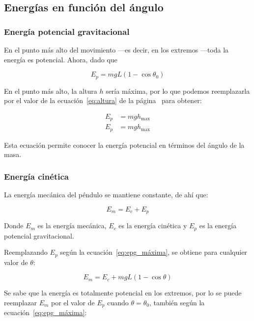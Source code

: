 \documentclass[letterpaper]{report}
\numberwithin{table}{section}
\begin{document}
\subsection{Energías en función del ángulo}

\subsubsection{Energía potencial gravitacional}

En el punto más alto del movimiento —es decir, en los extremos —toda
la energía es potencial. Ahora, dado que

\begin{equation*}
  E_{p} = mgL(1 - \cos \theta_{0})
\end{equation*}

En el punto más alto, la altura $h$ sería máxima, por lo que podemos
reemplazarla por el valor de la ecuación~\eqref{eq:altura} de la
página~\pageref{eq:altura} para obtener:

\begin{align}
  E_{p} &= mgh_{\max} \nonumber \\
  E_{p} &= mgh_{\max} \label{eq:epg_máxima}
\end{align}

Esta ecuación permite conocer la energía potencial en términos del
ángulo de la masa.

\subsubsection{Energía cinética}

La energía mecánica del péndulo se mantiene constante, de ahí que:

\begin{equation}
  E_{m} = E_{c} + E_{p}
\end{equation}

Donde $E_{m}$ es la energía mecánica, $E_{c}$ es la energía cinética y
$E_{p}$ es la energía potencial gravitacional.

Reemplazando $E_{p}$ según la ecuación~\eqref{eq:epg_máxima}, se
obtiene para cualquier valor de $\theta$:

\begin{equation}
  E_{m} = E_{c} + mgL(1 - \cos \theta)
\end{equation}

Se sabe que la energía es totalmente potencial en los extremos, por
lo se puede reemplazar $E_{m}$ por el valor de $E_{p}$ cuando $\theta
= \theta_{0}$, también según la ecuación~\eqref{eq:epg_máxima}:
\end{document}
